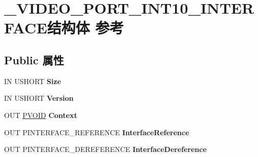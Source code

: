\hypertarget{struct___v_i_d_e_o___p_o_r_t___i_n_t10___i_n_t_e_r_f_a_c_e}{}\section{\+\_\+\+V\+I\+D\+E\+O\+\_\+\+P\+O\+R\+T\+\_\+\+I\+N\+T10\+\_\+\+I\+N\+T\+E\+R\+F\+A\+C\+E结构体 参考}
\label{struct___v_i_d_e_o___p_o_r_t___i_n_t10___i_n_t_e_r_f_a_c_e}
\subsection*{Public 属性}
\begin{DoxyCompactItemize}
\item 
\mbox{\label{struct___v_i_d_e_o___p_o_r_t___i_n_t10___i_n_t_e_r_f_a_c_e_a94106f90e9c746a5cb05040f87c6ba30}} 
IN U\+S\+H\+O\+RT {\bfseries Size}
\item 
\mbox{\label{struct___v_i_d_e_o___p_o_r_t___i_n_t10___i_n_t_e_r_f_a_c_e_a49f2d58cb96a16a2ca434631d20ad005}} 
IN U\+S\+H\+O\+RT {\bfseries Version}
\item 
\mbox{\label{struct___v_i_d_e_o___p_o_r_t___i_n_t10___i_n_t_e_r_f_a_c_e_ac55f07623511c1ed028dd74eb8e2bec1}} 
O\+UT \hyperlink{interfacevoid}{P\+V\+O\+ID} {\bfseries Context}
\item 
\mbox{\label{struct___v_i_d_e_o___p_o_r_t___i_n_t10___i_n_t_e_r_f_a_c_e_a98c3588f7202be2e9691ac87810500a3}} 
O\+UT P\+I\+N\+T\+E\+R\+F\+A\+C\+E\+\_\+\+R\+E\+F\+E\+R\+E\+N\+CE {\bfseries Interface\+Reference}
\item 
\mbox{\label{struct___v_i_d_e_o___p_o_r_t___i_n_t10___i_n_t_e_r_f_a_c_e_a361d974d86c7caa66383f400b344acae}} 
O\+UT P\+I\+N\+T\+E\+R\+F\+A\+C\+E\+\_\+\+D\+E\+R\+E\+F\+E\+R\+E\+N\+CE {\bfseries Interface\+Dereference}
\item 
\mbox{\label{struct___v_i_d_e_o___p_o_r_t___i_n_t10___i_n_t_e_r_f_a_c_e_aa2d357131311a38344a4a19091588720}} 

\end{DoxyCompactItemize}
